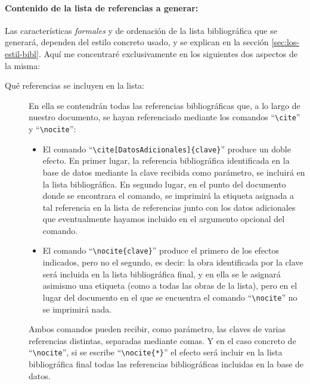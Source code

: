 \documentclass[a4paper,11pt]{article}
\def\cmd#1-{``\texttt{\textbackslash#1}''}
\begin{document}
\paragraph{Contenido de la lista de referencias a generar:\\[\baselineskip]}
\label{sec:contenido-de-la}

Las características \emph{formales} y  de ordenación de la lista bibliográfica
que  se generará,  dependen del  estilo concreto  usado, y  se explican  en la
sección \ref{sec:los-estil-bibl}.   Aquí me concentraré  exclusivamente en los
siguientes dos aspectos de la misma:

\begin{description}

\item[Qué referencias  se incluyen en la  lista:] En ella  se contendrán todas
  las  referencias bibliográficas  que, a  lo largo  de nuestro  documento, se
  hayan referenciado mediante los comandos \cmd cite- y \cmd nocite-:

  \begin{itemize}

  \item  El  comando \cmd  cite[DatosAdicionales]\{clave\}-  produce un  doble
    efecto. En  primer lugar, la  referencia bibliográfica identificada  en la
    base de datos mediante la clave recibida como parámetro, se incluirá en la
    lista bibliográfica. En segundo lugar,  en el punto del documento donde se
    encontrara el comando, se imprimirá  la etiqueta asignada a tal referencia
    en  la  lista   de  referencias  junto  con  los   datos  adicionales  que
    eventualmente hayamos incluido en el argumento opcional del comando.

  \item El  comando \cmd  nocite\{clave\}- produce el  primero de  los efectos
    indicados, pero no el segundo, es decir: la obra identificada por la clave
    será incluida  en la lista bibliográfica  final, y en ella  se le asignará
    asimismo una  etiqueta (como a  todas las obras  de la lista), pero  en el
    lugar del documento  en el que se encuentra el comando  \cmd nocite- no se
    imprimirá nada.

  \end{itemize}

  Ambos  comandos  pueden  recibir,  como  parámetro,  las  claves  de  varias
  referencias distintas, separadas  mediante comas.  Y en el  caso concreto de
  \cmd nocite-, si  se escribe \cmd nocite\{*\}- el efecto  será incluir en la
  lista bibliográfica final todas  las referencias bibliográficas incluidas en
  la base de datos.


\end{description}
\end{document}
